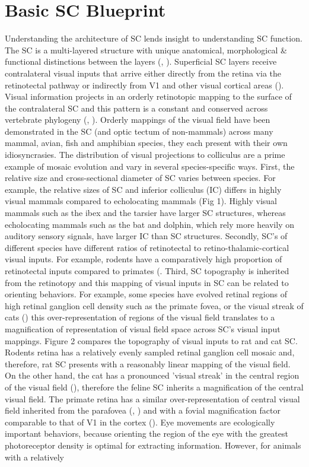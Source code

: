 \documentclass{ar-1col}
\begin{document}
\section{Basic SC Blueprint}
Understanding the architecture of SC lends insight to understanding SC function. The SC is a multi-layered structure with unique anatomical, morphological & functional distinctions between the layers (\cite{may2006mammalian}, \cite{white2011superior}). Superficial SC layers receive contralateral visual inputs that arrive either directly from the retina via the retinotectal pathway or indirectly from V1 and other visual cortical areas (\cite{boehnke2008importance}). Visual information projects in an orderly retinotopic mapping to the surface of the contralateral SC and this pattern is a constant and conserved across vertebrate phylogeny (\cite{stein1981organization}, \cite{schneider2014brain}). Orderly mappings of the visual field have been demonstrated in the SC (and optic tectum of non-mammals) across many mammal, avian, fish and amphibian species, they each present with their own idiosyncrasies. The distribution of visual projections to colliculus are a prime example of mosaic evolution and vary in several species-specific ways. First, the relative size and cross-sectional diameter of SC varies between species. For example, the relative sizes of SC and inferior colliculus (IC) differs in highly visual mammals compared to echolocating mammals (Fig 1). Highly visual mammals such as the ibex and the tarsier have larger SC structures, whereas echolocating mammals such as the bat and dolphin, which rely more heavily on auditory sensory signals, have larger IC than SC structures. Secondly, SC’s of different species have different ratios of retinotectal to retino-thalamic-cortical visual inputs. For example, rodents have a comparatively high proportion of retinotectal inputs compared to primates (\cite{schneider2014brain}. Third, SC topography is inherited from the retinotopy and this mapping of visual inputs in SC can be related to orienting behaviors. For example, some species have evolved retinal regions of high retinal ganglion cell density such as the primate fovea, or the visual streak of cats (\cite{hughes1977topography}) this over-representation of regions of the visual field translates to a magnification of representation of visual field space across SC's visual input mappings. Figure 2 compares the topography of visual inputs to rat and cat SC. Rodents retina has a relatively evenly sampled retinal ganglion cell mosaic and, therefore, rat SC presents with a reasonably linear mapping of the visual field. On the other hand, the cat has a pronounced 'visual streak' in the central region of the visual field (\cite{hughes1975quantitative}), therefore the feline SC inherits a magnification of the central visual field. The primate retina has a similar over-representation of central visual field inherited from the parafovea (\cite{cynader1972receptive}, \cite{ottes1986visuomotor}) and with a fovial magnification factor comparable to that of V1 in the cortex (\cite{chen2019foveal}). Eye movements are ecologically important behaviors, because orienting the region of the eye with the greatest photoreceptor density is optimal for extracting information. However, for animals with a relatively 
\end{document}
